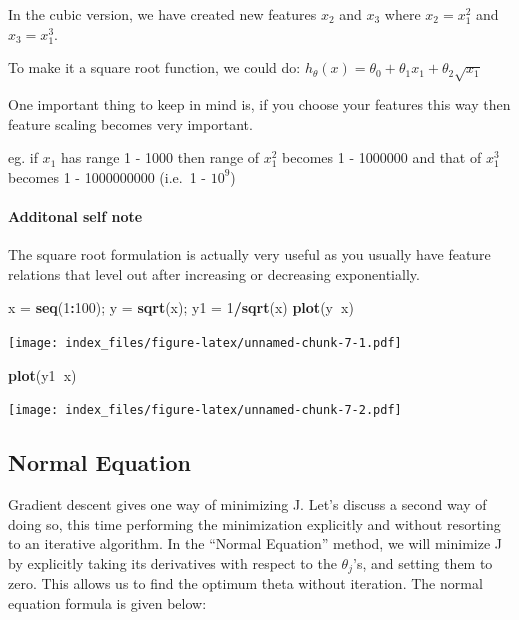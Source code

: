 \documentclass[
]{article}
\newenvironment{Shaded}{\begin{snugshade}}{\end{snugshade}}
\newcommand{\DecValTok}[1]{\textcolor[rgb]{0.00,0.00,0.81}{#1}}
\newcommand{\KeywordTok}[1]{\textcolor[rgb]{0.13,0.29,0.53}{\textbf{#1}}}
\newcommand{\NormalTok}[1]{#1}
\newcommand{\OperatorTok}[1]{\textcolor[rgb]{0.81,0.36,0.00}{\textbf{#1}}}
\newcommand{\StringTok}[1]{\textcolor[rgb]{0.31,0.60,0.02}{#1}}
\begin{document}
In the cubic version, we have created new features \(x_2\) and \(x_3\)
where \(x_2 = x_1^2\) and \(x_3 = x_1^3\).

To make it a square root function, we could do:
\(h_\theta(x) = \theta_0 + \theta_1 x_1 + \theta_2 \sqrt{x_1}\)

One important thing to keep in mind is, if you choose your features this
way then feature scaling becomes very important.

eg. if \(x_1\) has range 1 - 1000 then range of \(x_1^2\) becomes 1 -
1000000 and that of \(x_1^3\) becomes 1 - 1000000000 (i.e.~1 - \(10^9\))

\hypertarget{additonal-self-note-2}{%
\paragraph{Additonal self note}\label{additonal-self-note-2}}

{ The square root formulation is actually very useful as you usually
have feature relations that level out after increasing or decreasing
exponentially. }

\begin{Shaded}
\begin{Highlighting}[]
\NormalTok{x =}\StringTok{ }\KeywordTok{seq}\NormalTok{(}\DecValTok{1}\OperatorTok{:}\DecValTok{100}\NormalTok{); y =}\StringTok{ }\KeywordTok{sqrt}\NormalTok{(x); y1 =}\StringTok{ }\DecValTok{1}\OperatorTok{/}\KeywordTok{sqrt}\NormalTok{(x)}
\KeywordTok{plot}\NormalTok{(y}\OperatorTok{~}\NormalTok{x)}
\end{Highlighting}
\end{Shaded}

\texttt{[image: index\_files/figure-latex/unnamed-chunk-7-1.pdf]}

\begin{Shaded}
\begin{Highlighting}[]
\KeywordTok{plot}\NormalTok{(y1}\OperatorTok{~}\NormalTok{x)}
\end{Highlighting}
\end{Shaded}

\texttt{[image: index\_files/figure-latex/unnamed-chunk-7-2.pdf]}

\hypertarget{normal-equation}{%
\subsection{Normal Equation}\label{normal-equation}}

Gradient descent gives one way of minimizing J. Let's discuss a second
way of doing so, this time performing the minimization explicitly and
without resorting to an iterative algorithm. In the ``Normal Equation''
method, we will minimize J by explicitly taking its derivatives with
respect to the \(θ_j’\)s, and setting them to zero. This allows us to
find the optimum theta without iteration. The normal equation formula is
given below:
\end{document}

